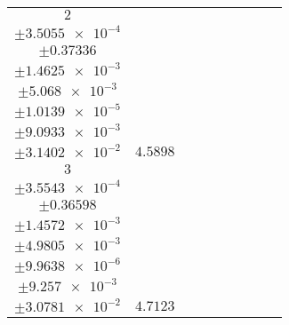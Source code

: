 \documentclass[8pt]{article}
\begin{document}
\begin{longtable}[l]{c c c c c c c c c}
$\num{2}$ & \begin{tabular}[c]{@{}c@{}}$\num{5.4325e-2}$ \\ $\pm\num{3.5055e-4}$\end{tabular} & \begin{tabular}[c]{@{}c@{}}$\num{8.1875e-3}$ \\ $\pm\num{0.37336}$\end{tabular} & \begin{tabular}[c]{@{}c@{}}$\num{-3.8348}$ \\ $\pm\num{1.4625e-3}$\end{tabular} & \begin{tabular}[c]{@{}c@{}}$\num{2.0274e+3}$ \\ $\pm\num{5.068e-3}$\end{tabular} & \begin{tabular}[c]{@{}c@{}}$\num{4.056}$ \\ $\pm\num{1.0139e-5}$\end{tabular} & \begin{tabular}[c]{@{}c@{}}$\num{1.1607}$ \\ $\pm\num{9.0933e-3}$\end{tabular} & \begin{tabular}[c]{@{}c@{}}$\num{4.2143}$ \\ $\pm\num{3.1402e-2}$\end{tabular} & $\num{4.5898}$\\
$\num{3}$ & \begin{tabular}[c]{@{}c@{}}$\num{5.6011e-2}$ \\ $\pm\num{3.5543e-4}$\end{tabular} & \begin{tabular}[c]{@{}c@{}}$\num{0.33542}$ \\ $\pm\num{0.36598}$\end{tabular} & \begin{tabular}[c]{@{}c@{}}$\num{3.8345}$ \\ $\pm\num{1.4572e-3}$\end{tabular} & \begin{tabular}[c]{@{}c@{}}$\num{2.0351e+3}$ \\ $\pm\num{4.9805e-3}$\end{tabular} & \begin{tabular}[c]{@{}c@{}}$\num{4.0713}$ \\ $\pm\num{9.9638e-6}$\end{tabular} & \begin{tabular}[c]{@{}c@{}}$\num{1.196}$ \\ $\pm\num{9.257e-3}$\end{tabular} & \begin{tabular}[c]{@{}c@{}}$\num{4.2069}$ \\ $\pm\num{3.0781e-2}$\end{tabular} & $\num{4.7123}$\\

\end{longtable}
\end{document}
